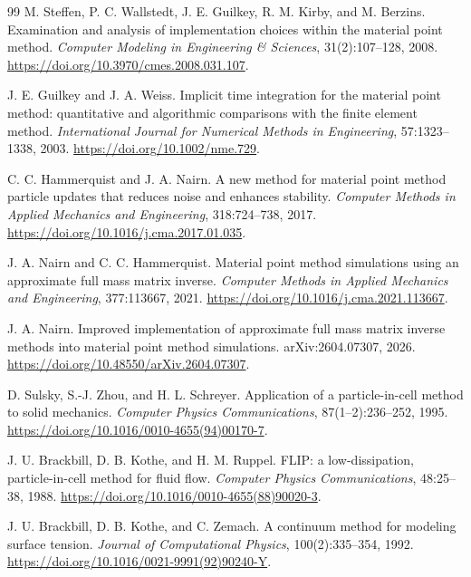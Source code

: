 \begin{thebibliography}{99}
M. Steffen, P. C. Wallstedt, J. E. Guilkey, R. M. Kirby, and M. Berzins.
\newblock Examination and analysis of implementation choices within the material point method.
\newblock \emph{Computer Modeling in Engineering \& Sciences}, 31(2):107--128, 2008.
\newblock \url{https://doi.org/10.3970/cmes.2008.031.107}.

J. E. Guilkey and J. A. Weiss.
\newblock Implicit time integration for the material point method: quantitative and algorithmic comparisons with the finite element method.
\newblock \emph{International Journal for Numerical Methods in Engineering}, 57:1323--1338, 2003.
\newblock \url{https://doi.org/10.1002/nme.729}.

C. C. Hammerquist and J. A. Nairn.
\newblock A new method for material point method particle updates that reduces noise and enhances stability.
\newblock \emph{Computer Methods in Applied Mechanics and Engineering}, 318:724--738, 2017.
\newblock \url{https://doi.org/10.1016/j.cma.2017.01.035}.

J. A. Nairn and C. C. Hammerquist.
\newblock Material point method simulations using an approximate full mass matrix inverse.
\newblock \emph{Computer Methods in Applied Mechanics and Engineering}, 377:113667, 2021.
\newblock \url{https://doi.org/10.1016/j.cma.2021.113667}.


J. A. Nairn.
\newblock Improved implementation of approximate full mass matrix inverse methods into material point method simulations.
\newblock arXiv:2604.07307, 2026.
\newblock \url{https://doi.org/10.48550/arXiv.2604.07307}.

D. Sulsky, S.-J. Zhou, and H. L. Schreyer.
\newblock Application of a particle-in-cell method to solid mechanics.
\newblock \emph{Computer Physics Communications}, 87(1--2):236--252, 1995.
\newblock \url{https://doi.org/10.1016/0010-4655(94)00170-7}.

J. U. Brackbill, D. B. Kothe, and H. M. Ruppel.
\newblock FLIP: a low-dissipation, particle-in-cell method for fluid flow.
\newblock \emph{Computer Physics Communications}, 48:25--38, 1988.
\newblock \url{https://doi.org/10.1016/0010-4655(88)90020-3}.

J. U. Brackbill, D. B. Kothe, and C. Zemach.
\newblock A continuum method for modeling surface tension.
\newblock \emph{Journal of Computational Physics}, 100(2):335--354, 1992.
\newblock \url{https://doi.org/10.1016/0021-9991(92)90240-Y}.



\end{thebibliography}
